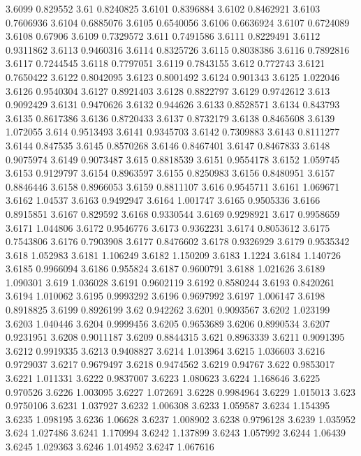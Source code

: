 3.6099  0.829552
3.61  0.8240825
3.6101  0.8396884
3.6102  0.8462921
3.6103  0.7606936
3.6104  0.6885076
3.6105  0.6540056
3.6106  0.6636924
3.6107  0.6724089
3.6108  0.67906
3.6109  0.7329572
3.611  0.7491586
3.6111  0.8229491
3.6112  0.9311862
3.6113  0.9460316
3.6114  0.8325726
3.6115  0.8038386
3.6116  0.7892816
3.6117  0.7244545
3.6118  0.7797051
3.6119  0.7843155
3.612  0.772743
3.6121  0.7650422
3.6122  0.8042095
3.6123  0.8001492
3.6124  0.901343
3.6125  1.022046
3.6126  0.9540304
3.6127  0.8921403
3.6128  0.8822797
3.6129  0.9742612
3.613  0.9092429
3.6131  0.9470626
3.6132  0.944626
3.6133  0.8528571
3.6134  0.843793
3.6135  0.8617386
3.6136  0.8720433
3.6137  0.8732179
3.6138  0.8465608
3.6139  1.072055
3.614  0.9513493
3.6141  0.9345703
3.6142  0.7309883
3.6143  0.8111277
3.6144  0.847535
3.6145  0.8570268
3.6146  0.8467401
3.6147  0.8467833
3.6148  0.9075974
3.6149  0.9073487
3.615  0.8818539
3.6151  0.9554178
3.6152  1.059745
3.6153  0.9129797
3.6154  0.8963597
3.6155  0.8250983
3.6156  0.8480951
3.6157  0.8846446
3.6158  0.8966053
3.6159  0.8811107
3.616  0.9545711
3.6161  1.069671
3.6162  1.04537
3.6163  0.9492947
3.6164  1.001747
3.6165  0.9505336
3.6166  0.8915851
3.6167  0.829592
3.6168  0.9330544
3.6169  0.9298921
3.617  0.9958659
3.6171  1.044806
3.6172  0.9546776
3.6173  0.9362231
3.6174  0.8053612
3.6175  0.7543806
3.6176  0.7903908
3.6177  0.8476602
3.6178  0.9326929
3.6179  0.9535342
3.618  1.052983
3.6181  1.106249
3.6182  1.150209
3.6183  1.1224
3.6184  1.140726
3.6185  0.9966094
3.6186  0.955824
3.6187  0.9600791
3.6188  1.021626
3.6189  1.090301
3.619  1.036028
3.6191  0.9602119
3.6192  0.8580244
3.6193  0.8420261
3.6194  1.010062
3.6195  0.9993292
3.6196  0.9697992
3.6197  1.006147
3.6198  0.8918825
3.6199  0.8926199
3.62  0.942262
3.6201  0.9093567
3.6202  1.023199
3.6203  1.040446
3.6204  0.9999456
3.6205  0.9653689
3.6206  0.8990534
3.6207  0.9231951
3.6208  0.9011187
3.6209  0.8844315
3.621  0.8963339
3.6211  0.9091395
3.6212  0.9919335
3.6213  0.9408827
3.6214  1.013964
3.6215  1.036603
3.6216  0.9729037
3.6217  0.9679497
3.6218  0.9474562
3.6219  0.94767
3.622  0.9853017
3.6221  1.011331
3.6222  0.9837007
3.6223  1.080623
3.6224  1.168646
3.6225  0.970526
3.6226  1.003095
3.6227  1.072691
3.6228  0.9984964
3.6229  1.015013
3.623  0.9750106
3.6231  1.037927
3.6232  1.006308
3.6233  1.059587
3.6234  1.154395
3.6235  1.098195
3.6236  1.06628
3.6237  1.008902
3.6238  0.9796128
3.6239  1.035952
3.624  1.027486
3.6241  1.170994
3.6242  1.137899
3.6243  1.057992
3.6244  1.06439
3.6245  1.029363
3.6246  1.014952
3.6247  1.067616
